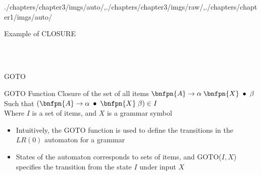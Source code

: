 \begin{graphicspathcontext}{{./chapters/chapter3/imgs/auto/},{./chapters/chapter3/imgs/raw/},{./chapters/chapter1/imgs/auto/}}
\begin{bibunit}[apalike]
\begin{frame}[t]{Example of CLOSURE}
\begin{scriptsize}
{\begin{tabular}[t]{|c|}
			\hline
		\end{tabular}
		\raisebox{-1em}{\Huge\dots}
	} \\[1em]
	\end{scriptsize}
	\small
\end{frame}

\begin{frame}{GOTO}
	\begin{definitionblock}{GOTO Function}
	Closure of the set of all items $\bnfpn{A} \bnfopo \alpha \; \bnfpn{X} \; \bnfindex \; \beta$ \\
	Such that $\left(\bnfpn{A} \bnfopo \alpha \; \bnfindex \; \bnfpn{X} \; \beta\right) \in I$ \\
	Where $I$ is a set of items, and $X$ is a grammar symbol
	\end{definitionblock}
	\vspace{1cm}
	\begin{itemize}
	\item Intuitively, the GOTO function is used to define the transitions in the $LR(0)$ automaton for a grammar
	\item States of the automaton corresponds to sets of items, and GOTO($I,X$) specifies the transition from the state $I$ under input $X$
	\end{itemize}
\end{frame}


\end{bibunit}
\end{graphicspathcontext}

